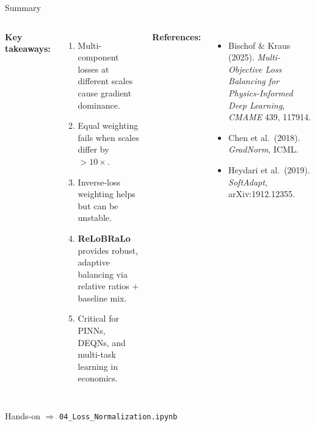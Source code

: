 \documentclass[aspectratio=169,11pt]{beamer}
\newcommand{\emphc}[1]{\textcolor{harvardcrimson}{#1}}
\begin{document}
\begin{frame}{Summary}
\small
\begin{columns}[T]
\textbf{Key takeaways:}
\begin{enumerate}\itemsep1pt
    \item Multi-component losses at different scales cause \emphc{gradient dominance}.
    \item Equal weighting fails when scales differ by $>10\times$.
    \item Inverse-loss weighting helps but can be unstable.
    \item \textbf{ReLoBRaLo} provides robust, adaptive balancing via relative ratios + baseline mix.
    \item Critical for PINNs, DEQNs, and multi-task learning in economics.
\end{enumerate}

\textbf{References:}
{\scriptsize
\begin{itemize}\itemsep0pt
    \item Bischof \& Kraus (2025). \emph{Multi-Objective Loss Balancing for Physics-Informed Deep Learning}, \emph{CMAME} 439, 117914.
    \item Chen et al.\ (2018). \emph{GradNorm}, ICML.
    \item Heydari et al.\ (2019). \emph{SoftAdapt}, arXiv:1912.12355.
\end{itemize}
}
\end{columns}

\vspace{0.3cm}
\begin{block}{Hands-on}
$\Rightarrow$ \texttt{04\_Loss\_Normalization.ipynb}
\end{block}
\end{frame}
\end{document}
